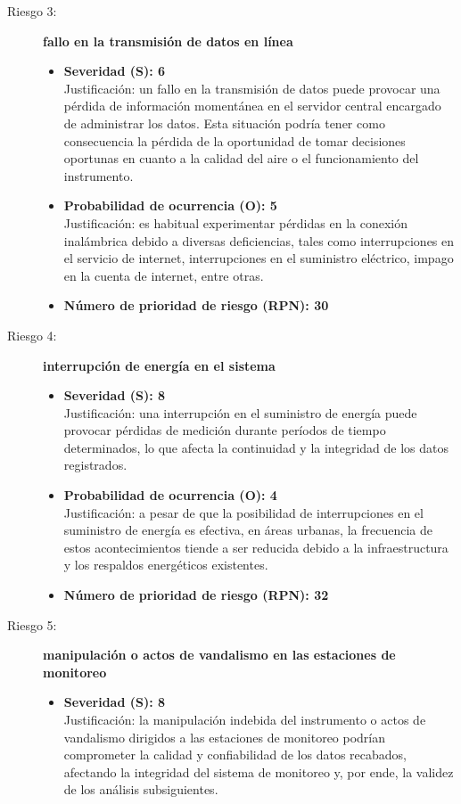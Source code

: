 \begin{description}
	
	\item[Riesgo 3:] \textbf{fallo en la transmisión de datos en línea}
	\begin{itemize}
		\item \textbf{Severidad (S): 6} \\
		Justificación: un fallo en la transmisión de datos puede provocar una pérdida de información momentánea en el servidor central encargado de administrar los datos. Esta situación podría tener como consecuencia la pérdida de la oportunidad de tomar decisiones oportunas en cuanto a la calidad del aire o el funcionamiento del instrumento.
		
		\item \textbf{Probabilidad de ocurrencia (O): 5} \\
		Justificación: es habitual experimentar pérdidas en la conexión inalámbrica debido a diversas deficiencias, tales como interrupciones en el servicio de internet, interrupciones en el suministro eléctrico, impago en la cuenta de internet, entre otras.
		
		\item \textbf{Número de prioridad de riesgo (RPN): 30} \\
	\end{itemize}
	
	
	\item[Riesgo 4:] \textbf{interrupción de energía en el sistema}
	\begin{itemize}
		\item \textbf{Severidad (S): 8} \\
		Justificación: una interrupción en el suministro de energía puede provocar pérdidas de medición durante períodos de tiempo determinados, lo que afecta la continuidad y la integridad de los datos registrados.
		
		\item \textbf{Probabilidad de ocurrencia (O): 4} \\
		Justificación: a pesar de que la posibilidad de interrupciones en el suministro de energía es efectiva, en áreas urbanas, la frecuencia de estos acontecimientos tiende a ser reducida debido a la infraestructura y los respaldos energéticos existentes.
		
		\item \textbf{Número de prioridad de riesgo (RPN): 32} \\
		
	\end{itemize}
	
	
	\item[Riesgo 5:] \textbf{manipulación o actos de vandalismo en las estaciones de monitoreo}
	\begin{itemize}
		\item \textbf{Severidad (S): 8} \\
		Justificación: la manipulación indebida del instrumento o actos de vandalismo dirigidos a las estaciones de monitoreo podrían comprometer la calidad y confiabilidad de los datos recabados, afectando la integridad del sistema de monitoreo y, por ende, la validez de los análisis subsiguientes.
		

\end{itemize}
\end{description}
